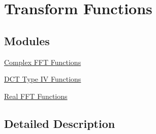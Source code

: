\hypertarget{group__group_transforms}{\section{Transform Functions}
\label{group__group_transforms}
}
\subsection*{Modules}
\begin{DoxyCompactItemize}
\item 
\hyperlink{group___c_f_f_t___c_i_f_f_t}{Complex F\-F\-T Functions}
\item 
\hyperlink{group___d_c_t4___i_d_c_t4}{D\-C\-T Type I\-V Functions}
\item 
\hyperlink{group___r_f_f_t___r_i_f_f_t}{Real F\-F\-T Functions}
\end{DoxyCompactItemize}


\subsection{Detailed Description}
